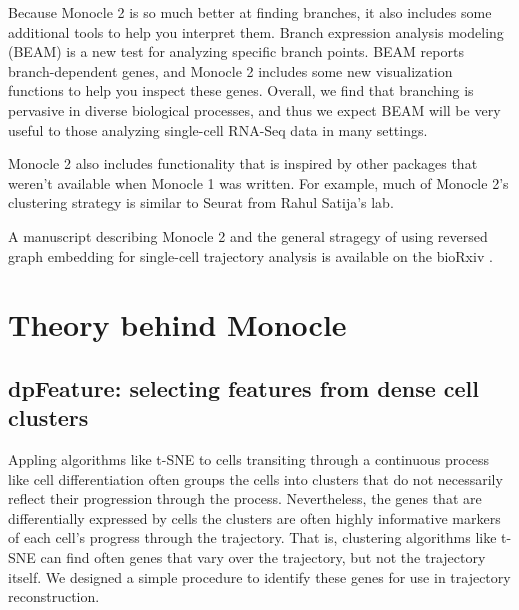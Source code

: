 \documentclass[10pt,oneside]{article}\usepackage[]{graphicx}\usepackage[]{color}
\begin{document}
Because Monocle 2 is so much better at finding branches, it also includes some additional tools to help you interpret them. Branch expression analysis modeling (BEAM) is a new test for analyzing specific branch points\cite{qiu2017single}. BEAM reports branch-dependent genes, and Monocle 2 includes some new visualization functions to help you inspect these genes. Overall, we find that branching is pervasive in diverse biological processes, and thus we expect BEAM will be very useful to those analyzing single-cell RNA-Seq data in many settings. 

Monocle 2 also includes functionality that is inspired by other packages that weren't available when Monocle 1 was written. For example, much of Monocle 2's clustering strategy is similar to
Seurat \cite{Satija2015-xb} from Rahul Satija's lab.  

A manuscript describing Monocle 2 and the general stragegy of using reversed 
graph embedding for single-cell trajectory analysis is available on the bioRxiv \cite{Qiu2017-nx}. 
 
\section{Theory behind Monocle}\label{theory}
\subsection{dpFeature: selecting features from dense cell clusters}
Appling algorithms like t-SNE to cells transiting through a continuous process like cell differentiation often groups the cells into clusters that do not necessarily reflect their progression through the process. Nevertheless, the genes that are differentially expressed by cells the clusters are often highly informative markers of each cell's progress through the trajectory. That is, clustering algorithms like t-SNE can find often genes that vary over the trajectory, but not the trajectory itself. We designed a simple procedure to identify these genes for use in trajectory reconstruction. 
	
\end{document}

